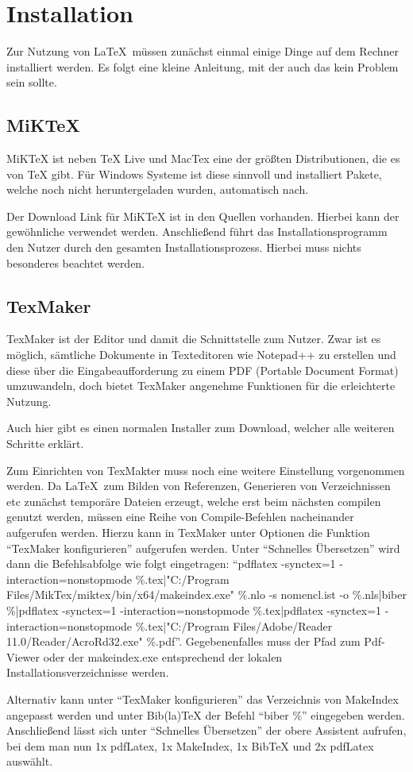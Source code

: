 \chapter{Installation}
\label{ch:installation}
Zur Nutzung von \LaTeX\ müssen zunächst einmal einige Dinge auf dem Rechner installiert werden. Es folgt eine kleine Anleitung, mit der auch das kein Problem sein sollte.

\section{MiKTeX}
MiKTeX ist neben TeX Live und MacTex eine der größten Distributionen, die es von TeX gibt. Für Windows Systeme ist diese sinnvoll und installiert Pakete, welche noch nicht heruntergeladen wurden, automatisch nach.

Der Download Link für MiKTeX ist in den Quellen vorhanden.\autocite[Vgl.][]{miktex} Hierbei kann der gewöhnliche  verwendet werden. Anschließend führt das Installationsprogramm den Nutzer durch den gesamten Installationsprozess. Hierbei muss nichts besonderes beachtet werden.

\section{TexMaker}
TexMaker ist der Editor und damit die Schnittstelle zum Nutzer. Zwar ist es möglich, sämtliche Dokumente in Texteditoren wie Notepad++ zu erstellen und diese über die Eingabeaufforderung zu einem PDF (Portable Document Format) umzuwandeln, doch bietet TexMaker angenehme Funktionen für die erleichterte Nutzung.

Auch hier gibt es einen normalen Installer zum Download, welcher alle weiteren Schritte erklärt.\autocite[Vgl.][]{texmaker}

Zum Einrichten von TexMakter muss noch eine weitere Einstellung vorgenommen werden. Da \LaTeX\ zum Bilden von Referenzen, Generieren von Verzeichnissen etc zunächst temporäre Dateien erzeugt, welche erst beim nächsten compilen genutzt werden, müssen eine Reihe von Compile-Befehlen nacheinander aufgerufen werden. Hierzu kann in TexMaker unter Optionen die Funktion \enquote{TexMaker konfigurieren} aufgerufen werden. Unter \enquote{Schnelles Übersetzen} wird dann die Befehlsabfolge wie folgt eingetragen: \enquote{pdflatex -synctex=1 -interaction=nonstopmode \%.tex|"C:/Program Files/MikTex/miktex/bin/x64/makeindex.exe" \%.nlo -s nomencl.ist -o \%.nls|biber \%|pdflatex -synctex=1 -interaction=nonstopmode \%.tex|pdflatex -synctex=1 -interaction=nonstopmode \%.tex|"C:/Program Files/Adobe/Reader 11.0/Reader/AcroRd32.exe" \%.pdf}. Gegebenenfalles muss der Pfad zum Pdf-Viewer oder der makeindex.exe entsprechend der lokalen Installationsverzeichnisse werden.

Alternativ kann unter \enquote{TexMaker konfigurieren} das Verzeichnis von MakeIndex angepasst werden und unter Bib(la)TeX der Befehl \enquote{biber \%} eingegeben werden. Anschließend lässt sich unter \enquote{Schnelles Übersetzen} der obere Assistent aufrufen, bei dem man nun 1x pdfLatex, 1x MakeIndex, 1x BibTeX und 2x pdfLatex auswählt. 